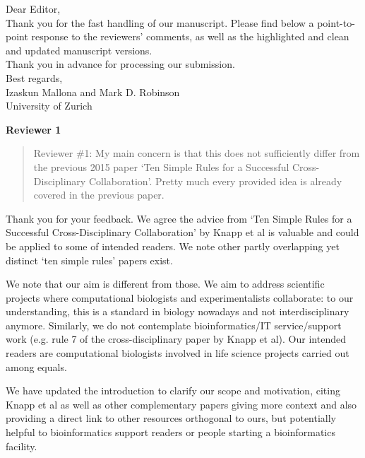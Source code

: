 \documentclass[a4paper]{article}
\begin{document}
\noindent Dear Editor,\\

Thank you for the fast handling of our manuscript. Please find below a point-to-point response to the reviewers' comments, as well as the highlighted and clean and updated manuscript versions.\\

Thank you in advance for processing our submission. \\

Best regards,\\

\noindent Izaskun Mallona and Mark D. Robinson \\
\noindent University of Zurich

\vspace{1cm}

 \textbf{Reviewer 1}

\begin{quote}
    Reviewer \#1: My main concern is that this does not sufficiently differ from the previous 2015 paper `Ten Simple Rules for a Successful Cross-Disciplinary Collaboration'. Pretty much every provided idea is already covered in the previous paper.

\end{quote}

Thank you for your feedback. We agree the advice from `Ten Simple Rules for a Successful Cross-Disciplinary Collaboration' by Knapp et al is valuable and could be applied to some of intended readers. We note other partly overlapping yet distinct `ten simple rules' papers exist.

We note that our aim is different from those. We aim to address scientific projects where computational biologists and experimentalists collaborate: to our understanding, this is a standard in biology nowadays and not interdisciplinary anymore. Similarly, we do not contemplate bioinformatics/IT service/support work (e.g. rule 7 of the cross-disciplinary paper by Knapp et al). Our intended readers are computational biologists involved in life science projects carried out among equals.

We have updated the introduction to clarify our scope and motivation, citing Knapp et al as well as other complementary papers giving more context and also providing a direct link to other resources orthogonal to ours, but potentially helpful to bioinformatics support readers or people starting a bioinformatics facility.\\
\end{document}
